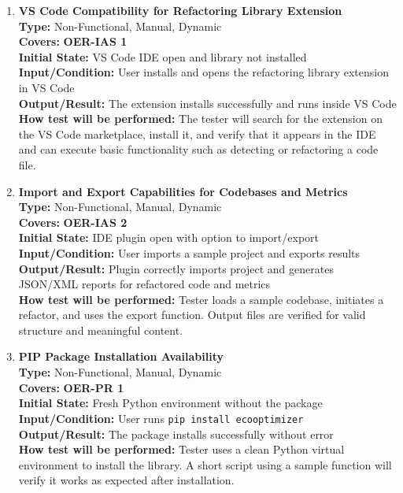 \documentclass[12pt, titlepage]{article}
\begin{document}
\begin{enumerate}[label={\bf \textcolor{Maroon}{test-OPE-\arabic*}}, wide=0pt, font=\itshape]

  \item \textbf{VS Code Compatibility for Refactoring Library Extension} \\[2mm]
    \textbf{Type:} Non-Functional, Manual, Dynamic \\
    \textbf{Covers:} \textbf{OER-IAS 1} \\ 
    \textbf{Initial State:} VS Code IDE open and library not installed \\
    \textbf{Input/Condition:} User installs and opens the refactoring library extension in VS Code \\
    \textbf{Output/Result:} The extension installs successfully and runs inside VS Code \\[2mm]
    \textbf{How test will be performed:} The tester will search for the extension on the VS Code marketplace, install it, and verify that it appears in the IDE and can execute basic functionality such as detecting or refactoring a code file.

  \item \textbf{Import and Export Capabilities for Codebases and Metrics} \\[2mm]
    \textbf{Type:} Non-Functional, Manual, Dynamic \\
    \textbf{Covers:} \textbf{OER-IAS 2} \\
    \textbf{Initial State:} IDE plugin open with option to import/export \\
    \textbf{Input/Condition:} User imports a sample project and exports results \\
    \textbf{Output/Result:} Plugin correctly imports project and generates JSON/XML reports for refactored code and metrics \\[2mm]
    \textbf{How test will be performed:} Tester loads a sample codebase, initiates a refactor, and uses the export function. Output files are verified for valid structure and meaningful content.

  \item \textbf{PIP Package Installation Availability} \\[2mm]
    \textbf{Type:} Non-Functional, Manual, Dynamic \\
    \textbf{Covers:} \textbf{OER-PR 1} \\
    \textbf{Initial State:} Fresh Python environment without the package \\
    \textbf{Input/Condition:} User runs \texttt{pip install ecooptimizer} \\
    \textbf{Output/Result:} The package installs successfully without error \\[2mm]
    \textbf{How test will be performed:} Tester uses a clean Python virtual environment to install the library. A short script using a sample function will verify it works as expected after installation.

\end{enumerate}
\end{document}
